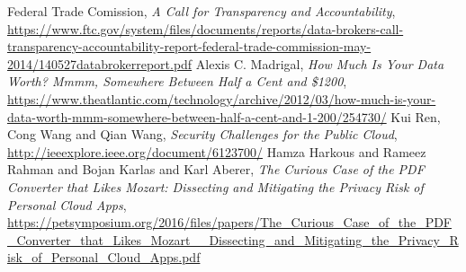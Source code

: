 \documentclass[11pt,twocolumn,a4paper,DIV=calc]{scrartcl}
\begin{document}
\begin{thebibliography}{99}
  Federal Trade Comission, \emph{A Call for Transparency and Accountability}, \url{https://www.ftc.gov/system/files/documents/reports/data-brokers-call-transparency-accountability-report-federal-trade-commission-may-2014/140527databrokerreport.pdf}
  Alexis C. Madrigal, \emph{How Much Is Your Data Worth? Mmmm, Somewhere Between Half a Cent and \$1200}, \url{https://www.theatlantic.com/technology/archive/2012/03/how-much-is-your-data-worth-mmm-somewhere-between-half-a-cent-and-1-200/254730/}
  Kui Ren, Cong Wang and Qian Wang, \emph{Security Challenges for the Public Cloud}, \url{http://ieeexplore.ieee.org/document/6123700/}
  Hamza Harkous and Rameez Rahman and Bojan Karlas and Karl Aberer, \emph{The Curious Case of the PDF Converter that Likes Mozart: Dissecting and Mitigating the Privacy Risk of Personal Cloud Apps}, \url{https://petsymposium.org/2016/files/papers/The\_Curious\_Case\_of\_the\_PDF\_Converter\_that\_Likes\_Mozart\_\_Dissecting\_and\_Mitigating\_the\_Privacy\_Risk\_of\_Personal\_Cloud\_Apps.pdf}
\end{thebibliography}
\end{document}
